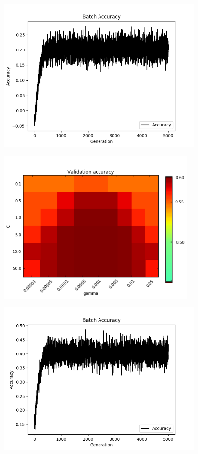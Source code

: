 \begin{center}
\includegraphics[height=3.0in]{figuras/Figure_2.png}
\end{center}

\begin{center}
\includegraphics[height=3.0in]{figuras/58e171451b12ce00012bd71d.png}
\end{center}

\begin{center}
\includegraphics[height=3.0in]{figuras/Figure_3.png}
\end{center}

